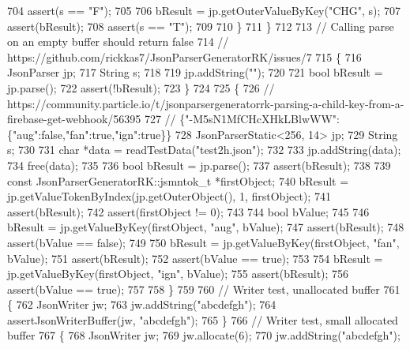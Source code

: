 \begin{DoxyCode}
{{{{{{704             assert(s == \textcolor{stringliteral}{"F"});
705 
706             bResult = jp.getOuterValueByKey(\textcolor{stringliteral}{"CHG"}, s);
707             assert(bResult);
708             assert(s == \textcolor{stringliteral}{"T"});
709 
710         \}
711     \}
712 
713     \textcolor{comment}{// Calling parse on an empty buffer should return false}
714     \textcolor{comment}{// https://github.com/rickkas7/JsonParserGeneratorRK/issues/7}
715     \{
716         JsonParser jp;
717         String s;
718 
719         jp.addString(\textcolor{stringliteral}{""});
720         
721         \textcolor{keywordtype}{bool} bResult = jp.parse();
722         assert(!bResult);
723     \}
724 
725     \{
726         \textcolor{comment}{//
       https://community.particle.io/t/jsonparsergeneratorrk-parsing-a-child-key-from-a-firebase-get-webhook/56395}
727         \textcolor{comment}{// \{"-M5sN1MfCHcXHkLBlwWW":\{"aug":false,"fan":true,"ign":true\}\}}
728         JsonParserStatic<256, 14> jp;
729         String s;
730 
731         \textcolor{keywordtype}{char} *data = readTestData(\textcolor{stringliteral}{"test2h.json"});
732 
733         jp.addString(data);
734         free(data);
735 
736         \textcolor{keywordtype}{bool} bResult = jp.parse();
737         assert(bResult);
738 
739         \textcolor{keyword}{const} JsonParserGeneratorRK::jsmntok_t *firstObject;
740         bResult = jp.getValueTokenByIndex(jp.getOuterObject(), 1, firstObject);
741         assert(bResult);
742         assert(firstObject != 0);
743 
744         \textcolor{keywordtype}{bool} bValue;
745 
746         bResult = jp.getValueByKey(firstObject, \textcolor{stringliteral}{"aug"}, bValue);
747         assert(bResult);
748         assert(bValue == \textcolor{keyword}{false});
749 
750         bResult = jp.getValueByKey(firstObject, \textcolor{stringliteral}{"fan"}, bValue);
751         assert(bResult);
752         assert(bValue == \textcolor{keyword}{true});
753 
754         bResult = jp.getValueByKey(firstObject, \textcolor{stringliteral}{"ign"}, bValue);
755         assert(bResult);
756         assert(bValue == \textcolor{keyword}{true});
757 
758     \}
759 
760     \textcolor{comment}{// Writer test, unallocated buffer}
761     \{
762         JsonWriter jw;
763         jw.addString(\textcolor{stringliteral}{"abcdefgh"});
764         assertJsonWriterBuffer(jw, \textcolor{stringliteral}{"abcdefgh"});
765     \}
766     \textcolor{comment}{// Writer test, small allocated buffer}
767     \{
768         JsonWriter jw;
769         jw.allocate(6);
770         jw.addString(\textcolor{stringliteral}{"abcdefgh"});
}}}}}}
\end{DoxyCode}
